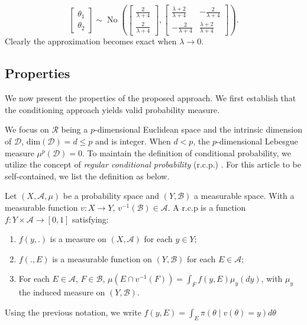 \documentclass[10pt]{article}
\newcommand{\mc}[1]{\mathcal{#1}}
\DeclareMathOperator{\No}{No}
\DeclareMathOperator{\1}{\mathbbm{1}}
\begin{document}
$$\begin{bmatrix} \theta_1 \\ \theta_2 \end{bmatrix} \sim
\No \left(
 \begin{bmatrix} \frac{2}{\lambda+4} \\ \frac{2}{\lambda+4} \end{bmatrix},
\begin{bmatrix} \frac{\lambda+2}{\lambda+4} & -\frac{2}{\lambda+4}  \\  -\frac{2}{\lambda+4}  &\frac{\lambda+2}{\lambda+4} \end{bmatrix}
\right).$$
Clearly the approximation becomes exact when $\lambda\rightarrow 0$.

\subsection{Properties}

We now present the properties of the proposed approach. We first establish
that the conditioning approach yields valid probability measure.

We focus on $\mc R$ being a $p$-dimensional Euclidean space and the
intrinsic dimension of $\mc D$, $\mbox{dim}(\mc D)=d\le p$ and is integer.
When $d<p$, the
$p$-dimensional Lebesgue measure $\mu^p(\mc D)=0$. To maintain the definition
of conditional probability, we utilize the concept of {\it regular
conditional probability} (r.c.p.)
\citep{kolmogorov1950foundations}. For this article to be self-contained, we list the definition as below.

Let $(X, \mathscr A, \mu)$ be a probability space and $(Y, \mathscr B)$ a measurable space. With a measurable function $v:X\rightarrow Y$, $v^{-1}(\mathscr B)\in \mathscr A$.
A r.c.p is a function
$f: Y\times \mathscr A \rightarrow[0,1]$ satisfying:

\begin{enumerate}
	\item $f(y, .)$ is a measure on $(X,\mathscr A)$ for each $y \in
		Y$;
	\item $f(., E)$ is a measurable function on $(Y,\mathscr B)$ for each $E\in \mathscr A$;
	\item For each $E \in \mathscr A$, $F\in \mathscr B$,
		$\mu(E \cap v^{-1}(F))=\int_{F} f(y, E) \mu_y(dy)$, with
		$\mu_y$ the induced measure on $(Y,\mathscr B)$.
\end{enumerate}

Using the previous notation, we write $f(y,E)= \int_E \pi(\theta
\mid v(\theta)=y) d\theta$
\end{document}
